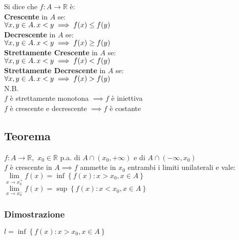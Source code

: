 \documentclass[a4paper, twoside, italian, 11pt]{book}
\newcommand{\braces}[1] {\left \{ #1 \right \}}
\newcommand{\R}{\mathbb{R}}
\begin{document}
\noindent
Si dice che $f : A \rightarrow \R$ è: \\

\noindent
\textbf{Crescente} in $A$ se: \\

$\forall x, y \in A \ldotp x < y \implies f(x) \leq f(y)$ \\

\noindent
\textbf{Decrescente} in $A$ se: \\

$\forall x, y \in A \ldotp x < y \implies f(x) \geq f(y)$ \\

\noindent
\textbf{Strettamente Crescente} in $A$ se: \\

$\forall x, y \in A \ldotp x < y \implies f(x) < f(y)$ \\

\noindent
\textbf{Strettamente Decrescente} in $A$ se: \\

$\forall x, y \in A \ldotp x < y \implies f(x) > f(y)$ \\

\noindent
N.B. \\
$f$ è strettamente monotona $\implies f$ è iniettiva \\
$f$ è crescente e decrescente $\implies f$ è costante


\subsection{Teorema}

\noindent
$f : A \rightarrow \R,$ $x_0 \in \R$ p.a. di $A \cap (x_0, +\infty)$ e di $A \cap (-\infty, x_0)$ \\

\noindent
$f$ è crescente in $A \implies f$ ammette in $x_0$ entrambi i limiti unilaterali e vale: \\

$\lim\limits_{x \to x_0^+} f(x) = \inf \braces{f(x) : x > x_0, x \in A}$ \\

$\lim\limits_{x \to x_0^-} f(x) = \sup \braces{f(x) : x < x_0, x \in A}$


\subsubsection{Dimostrazione}

\noindent
$l = \inf \braces{f(x) : x > x_0, x \in A}$ \\
\end{document}
